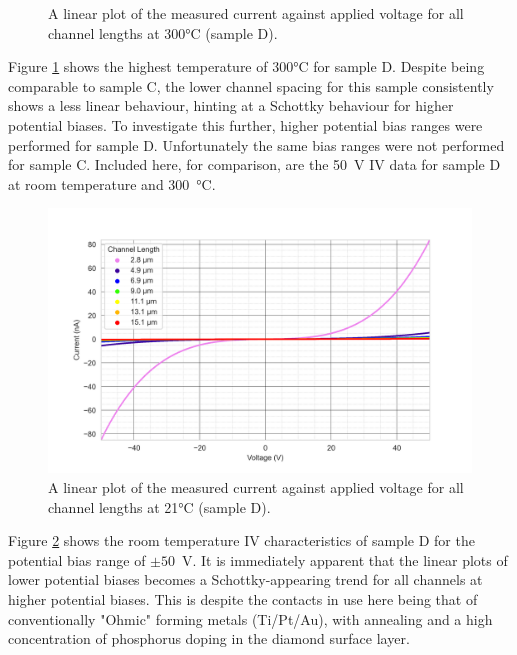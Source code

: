 \begin{refsection}
\begin{figure}[H]
    \caption{A linear plot of the measured current against applied voltage for all channel lengths at 300\si{\degreeCelsius} (sample D).}
    \label{fig:D_current_voltage_300_10V}
\end{figure}
Figure \ref{fig:D_current_voltage_300_10V} shows the highest temperature of 300\si{\degreeCelsius} for sample D. Despite being comparable to sample C, the lower channel spacing for this sample consistently shows a less linear behaviour, hinting at a Schottky behaviour for higher potential biases. To investigate this further, higher potential bias ranges were performed for sample D. Unfortunately the same bias ranges were not performed for sample C. Included here, for comparison, are the 50~\si{\volt} IV data for sample D at room temperature and 300~\si{\degreeCelsius}.

\begin{figure}[H]
    \centering
    \includegraphics[width=\textwidth]{Chapter3/Figs/Raster/Sample D 2019/IV/50V IV characteristics at 21 C.png}
    \caption{A linear plot of the measured current against applied voltage for all channel lengths at 21\si{\degreeCelsius} (sample D).}
    \label{fig:D_current_voltage_21_50V}
\end{figure}
Figure \ref{fig:D_current_voltage_21_50V} shows the room temperature IV characteristics of sample D for the potential bias range of $\pm50$~\si{\volt}. It is immediately apparent that the linear plots of lower potential biases becomes a Schottky-appearing trend for all channels at higher potential biases. This is despite the contacts in use here being that of conventionally "Ohmic" forming metals (Ti/Pt/Au), with annealing and a high concentration of phosphorus doping in the diamond surface layer.


\end{refsection}
